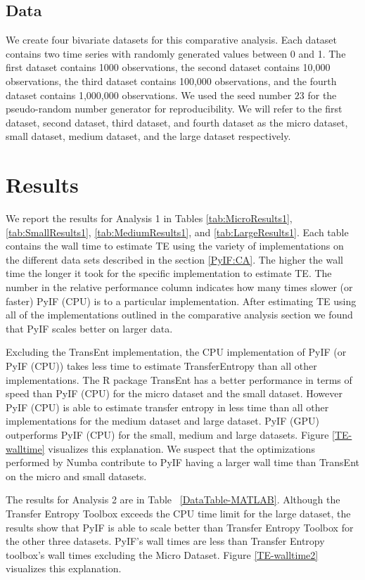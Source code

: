 \subsection{Data}

We create four bivariate datasets for this comparative analysis. Each dataset contains two time series with randomly generated values between 0 and 1. The first dataset contains 1000 observations, the second dataset contains 10,000 observations, the third dataset contains 100,000 observations, and the fourth dataset contains 1,000,000 observations.  We used the seed number  \(23\) for the pseudo-random number generator for reproducibility. We will refer to the first dataset, second dataset, third dataset, and fourth dataset as the micro dataset, small dataset, medium dataset, and the large dataset respectively.


\section{Results}

We report the results for Analysis 1 in Tables \ref{tab:MicroResults1},  \ref{tab:SmallResults1}, \ref{tab:MediumResults1}, and \ref{tab:LargeResults1}.  Each table contains the wall time to estimate TE using the variety of implementations on the different data sets described in the section \ref{PyIF:CA}.  The higher the wall time the longer it took for the specific implementation to estimate TE.  The number in the relative performance  column indicates how many times slower (or faster) PyIF (CPU) is to a particular implementation.  After estimating TE using all of the implementations outlined in the comparative analysis section we found that PyIF scales better on larger data.  

Excluding the TransEnt implementation, the CPU implementation of PyIF (or PyIF (CPU)) takes less time to estimate TransferEntropy than all other implementations. The R package TransEnt has a better performance in terms of speed than PyIF (CPU) for the micro dataset and the small dataset. However PyIF (CPU) is able to estimate transfer entropy in less time than all other implementations for the medium dataset and large dataset. PyIF (GPU) outperforms PyIF (CPU) for the small, medium and large datasets. Figure \ref{TE-walltime} visualizes this explanation. We suspect that the optimizations performed by Numba contribute to PyIF having a larger wall time than TransEnt on the micro and small datasets.

The results for Analysis 2 are in Table ~\ref{DataTable-MATLAB}.  Although the Transfer Entropy Toolbox exceeds the CPU time limit for the large dataset, the results show that PyIF is able to scale better than Transfer Entropy Toolbox for the other three datasets. PyIF's wall times are less than Transfer Entropy toolbox's wall times excluding the Micro Dataset.  Figure \ref{TE-walltime2} visualizes this explanation.


